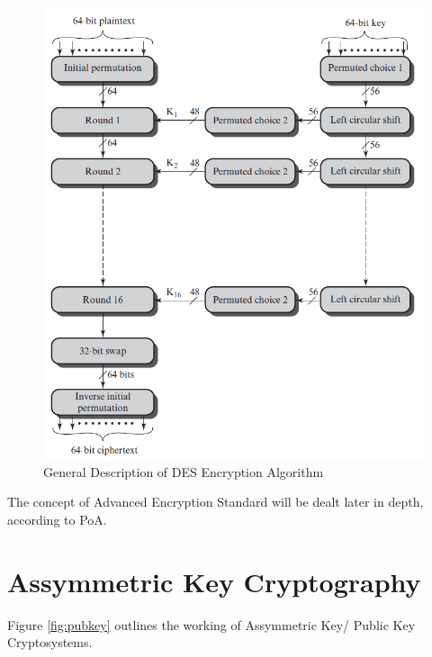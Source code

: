 \documentclass{article}
\begin{document}
\begin{figure}[h]
    \centering
    \includegraphics[width=\textwidth]{des.png}
    \caption{General Description of DES Encryption Algorithm \cite{des}}
    \label{fig:des}
\end{figure}

The concept of Advanced Encryption Standard will be dealt later in depth, according to PoA.

\section{Assymmetric Key Cryptography}
Figure \ref{fig:pubkey} outlines the working of Assymmetric Key/ Public Key Cryptosystems.
\end{document}
